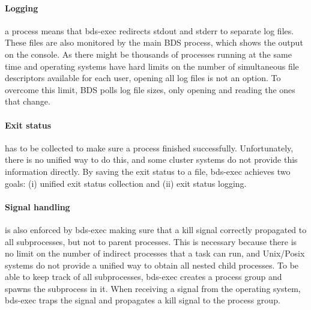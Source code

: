 \paragraph{Logging} a process means that bds-exec redirects stdout and stderr to separate log files. These files are also monitored by the main BDS process, which shows the output on the console. As there might be thousands of processes running at the same time and operating systems have hard limits on the number of simultaneous file descriptors available for each user, opening all log files is not an option. To overcome this limit, BDS polls log file sizes, only opening and reading the ones that change.

\paragraph{Exit status} has to be collected to make sure a process finished successfully. Unfortunately, there is no unified way to do this, and some cluster systems do not provide this information directly. By saving the exit status to a file, bds-exec achieves two goals: (i) unified exit status collection and (ii) exit status logging.

\paragraph{Signal handling} is also enforced by bds-exec making sure that a kill signal correctly propagated to all subprocesses, but not to parent processes. This is necessary because there is no limit on the number of indirect processes that a task can run, and Unix/Posix systems do not provide a unified way to obtain all nested child processes. To be able to keep track of all subprocesses, bds-exec creates a process group and spawns the subprocess in it. When receiving a signal from the operating system, bds-exec traps the signal and propagates a kill signal to the process group.

